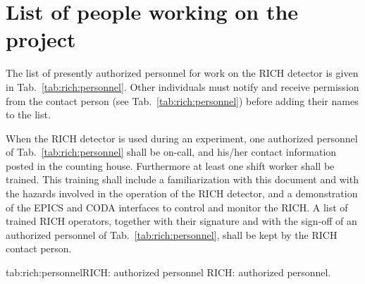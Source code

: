 \section{List of people working on the project} 
 
The list
of presently authorized personnel for work on the RICH detector 
is given in Tab.~\ref{tab:rich:personnel}.
Other individuals must notify and receive permission from
the contact person (see Tab.~\ref{tab:rich:personnel}) before adding their names 
to the list. 

When the RICH detector is used during an experiment, one authorized personnel of 
Tab.~\ref{tab:rich:personnel} shall be on-call, and his/her contact information
posted in the counting house. Furthermore at least one shift worker shall be 
trained. 
This training shall include a familiarization with this document and with 
the hazards involved in the operation of the RICH detector, and a demonstration
of the EPICS and CODA interfaces to control and monitor the RICH.
A list of trained RICH operators, together with their signature and 
with the sign-off of an authorized personnel of Tab.~\ref{tab:rich:personnel},
shall be kept by the RICH contact person.


\begin{namestab}{tab:rich:personnel}{RICH: authorized personnel}{
RICH: authorized personnel.}
 \EvaristoCisbani{}
 \FrancescoCusanno{}
\end{namestab}


